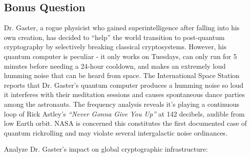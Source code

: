 \documentclass[10pt,a4paper,american]{exam}
\begin{document}
\begin{tcolorbox}[colframe=EarthBrown!30!white,colback=EarthBrown!5!white]
	\section*{Bonus Question\hfill{}}
	\begin{questions}
		\bonusquestion[10] Dr. Gaster, a rogue physicist who gained superintelligence after falling into his own creation, has decided to ``help'' the world transition to post-quantum cryptography by selectively breaking classical cryptosystems. However, his quantum computer is peculiar - it only works on Tuesdays, can only run for 5 minutes before needing a 24-hour cooldown, and makes an extremely loud humming noise that can be heard from space. The International Space Station reports that Dr. Gaster's quantum computer produces a humming noise so loud it interferes with their meditation sessions and causes spontaneous dance parties among the astronauts. The frequency analysis reveals it's playing a continuous loop of Rick Astley's \textit{``Never Gonna Give You Up''} at 142 decibels, audible from low Earth orbit. NASA is concerned this constitutes the first documented case of quantum rickrolling and may violate several intergalactic noise ordinances.

		Analyze Dr. Gaster's impact on global cryptographic infrastructure:
\end{questions}
\end{tcolorbox}
\end{document}
